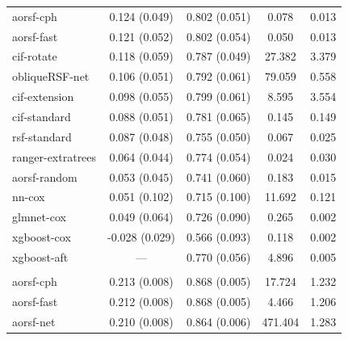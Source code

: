 \documentclass{article}\usepackage[]{graphicx}\usepackage[]{xcolor}
\newenvironment{knitrout}{}{} %
\begin{document}
\begin{knitrout}
\begin{longtable}[t]{lcccc}
\hspace{1em}aorsf-cph & 0.124 (0.049) & 0.802 (0.051) & 0.078 & 0.013\\
\hspace{1em}aorsf-fast & 0.121 (0.052) & 0.802 (0.054) & 0.050 & 0.013\\
\hspace{1em}cif-rotate & 0.118 (0.059) & 0.787 (0.049) & 27.382 & 3.379\\
\hspace{1em}obliqueRSF-net & 0.106 (0.051) & 0.792 (0.061) & 79.059 & 0.558\\
\hspace{1em}cif-extension & 0.098 (0.055) & 0.799 (0.061) & 8.595 & 3.554\\
\hspace{1em}cif-standard & 0.088 (0.051) & 0.781 (0.065) & 0.145 & 0.149\\
\hspace{1em}rsf-standard & 0.087 (0.048) & 0.755 (0.050) & 0.067 & 0.025\\
\hspace{1em}ranger-extratrees & 0.064 (0.044) & 0.774 (0.054) & 0.024 & 0.030\\
\hspace{1em}aorsf-random & 0.053 (0.045) & 0.741 (0.060) & 0.183 & 0.015\\
\hspace{1em}nn-cox & 0.051 (0.102) & 0.715 (0.100) & 11.692 & 0.121\\
\hspace{1em}glmnet-cox & 0.049 (0.064) & 0.726 (0.090) & 0.265 & 0.002\\
\hspace{1em}xgboost-cox & -0.028 (0.029) & 0.566 (0.093) & 0.118 & 0.002\\
\hspace{1em}xgboost-aft & --- & 0.770 (0.056) & 4.896 & 0.005\\
\addlinespace[0.3em]
\multicolumn{5}{l}{\textit{\textbf{Non-alcohol fatty liver disease; death, n = 17549, p = 24}}}\\
\hline
\hspace{1em}aorsf-cph & 0.213 (0.008) & 0.868 (0.005) & 17.724 & 1.232\\
\hspace{1em}aorsf-fast & 0.212 (0.008) & 0.868 (0.005) & 4.466 & 1.206\\
\hspace{1em}aorsf-net & 0.210 (0.008) & 0.864 (0.006) & 471.404 & 1.283\\

\end{longtable}
\end{knitrout}
\end{document}

